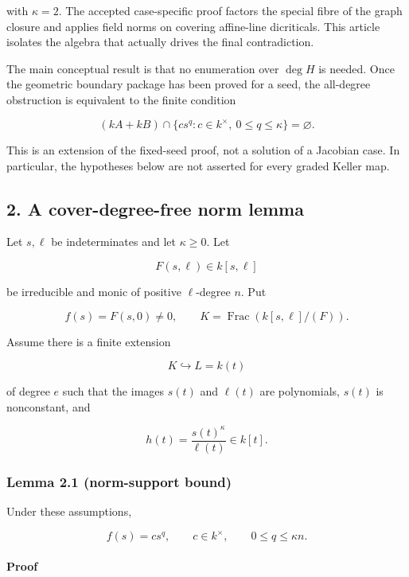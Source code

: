 \documentclass[
  11pt,
  a4paper,
]{article}
\begin{document}
with \(\kappa=2\). The accepted case-specific proof factors the special
fibre of the graph closure and applies field norms on covering
affine-line dicriticals. This article isolates the algebra that actually
drives the final contradiction.

The main conceptual result is that no enumeration over \(\deg H\) is
needed. Once the geometric boundary package has been proved for a seed,
the all-degree obstruction is equivalent to the finite condition

\[
(kA+kB)\cap
\{cs^q:c\in k^\times,\ 0\le q\le\kappa\}=\varnothing.
\tag{1.2}
\]

This is an extension of the fixed-seed proof, not a solution of a
Jacobian case. In particular, the hypotheses below are not asserted for
every graded Keller map.

\subsection{2. A cover-degree-free norm
lemma}\label{a-cover-degree-free-norm-lemma}

Let \(s,\ell\) be indeterminates and let \(\kappa\ge0\). Let

\[
F(s,\ell)\in k[s,\ell]
\]

be irreducible and monic of positive \(\ell\)-degree \(n\). Put

\[
f(s)=F(s,0)\ne0,
\qquad
K=\operatorname{Frac}(k[s,\ell]/(F)).
\]

Assume there is a finite extension

\[
K\hookrightarrow L=k(t)
\]

of degree \(e\) such that the images \(s(t)\) and \(\ell(t)\) are
polynomials, \(s(t)\) is nonconstant, and

\[
h(t)=\frac{s(t)^\kappa}{\ell(t)}\in k[t].
\tag{2.1}
\]

\subsubsection{Lemma 2.1 (norm-support
bound)}\label{lemma-2.1-norm-support-bound}

Under these assumptions,

\[
\boxed{f(s)=cs^q,\qquad c\in k^\times,\qquad0\le q\le\kappa n.}
\tag{2.2}
\]

\paragraph{Proof}\label{proof}
\end{document}
